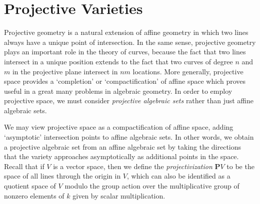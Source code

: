 
\section{Projective Varieties}

Projective geometry is a natural extension of affine geometry in which two lines always have a unique point of intersection. In the same sense, projective geometry plays an important role in the theory of curves, because the fact that two lines intersect in a unique position extends to the fact that two curves of degree $n$ and $m$ in the projective plane intersect in $nm$ locations. More generally, projective space provides a `completion' or `compactification' of affine space which proves useful in a great many problems in algebraic geometry. In order to employ projective space, we must consider \emph{projective algebraic sets} rather than just affine algebraic sets.

We may view projective space as a compactification of affine space, adding `asymptotic' intersection points to affine algebraic sets. In other words, we obtain a projective algebraic set from an affine algebraic set by taking the directions that the variety approaches asymptotically as additional points in the space. Recall that if $V$ is a vector space, then we define the {\it projectivization} $\mathbf{P} V$ to be the space of all lines through the origin in $V$, which can also be identified as a quotient space of $V$ modulo the group action over the multiplicative group of nonzero elements of $k$ given by scalar multiplication.

